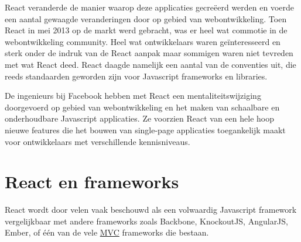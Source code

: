 	React veranderde de manier waarop deze applicaties gecreëerd werden en voerde een aantal gewaagde veranderingen door op gebied van webontwikkeling. Toen React in mei 2013 op de markt werd gebracht, was er heel wat commotie in de webontwikkeling community. Heel wat ontwikkelaars waren geïnteresseerd en sterk onder de indruk van de React aanpak maar sommigen waren niet tevreden met wat React deed. React daagde namelijk een aantal van de conventies uit, die reeds standaarden geworden zijn voor Javascript frameworks en libraries.
	
	De ingenieurs bij Facebook hebben met React een mentaliteitswijziging doorgevoerd op gebied van webontwikkeling en het maken van schaalbare en onderhoudbare Javascript applicaties. Ze voorzien React van een hele hoop nieuwe features die het bouwen van single-page applicaties toegankelijk maakt voor ontwikkelaars met verschillende kennisniveaus. \citep{gackenheimer:react}
	
\section{React en frameworks}
	
	React wordt door velen vaak beschouwd als een volwaardig Javascript framework vergelijkbaar met andere frameworks zoals Backbone, KnockoutJS, AngularJS, Ember, of één van de vele \hyperref[mvc]{MVC} frameworks die bestaan.
	
